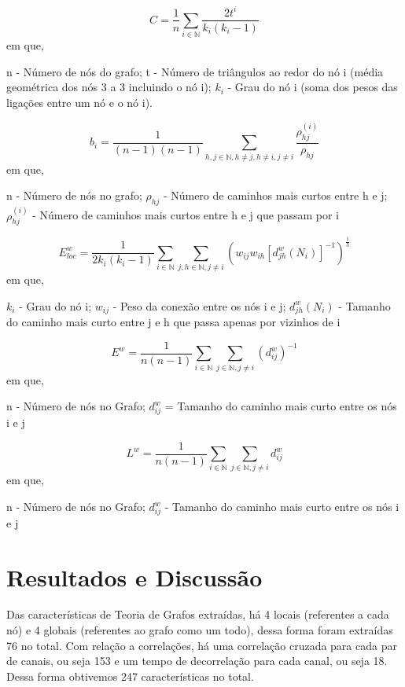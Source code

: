 \documentclass[a4paper,11pt]{article} %
\begin{document}
\begin{equation} \label{eq:coeficiente}
	C = \frac{1}{n} \sum_{i \in \mathbb{N}} \dfrac{2t^i}{k_i(k_i-1)}
\end{equation}
em que,

n - Número de nós do grafo; t - Número de triângulos ao redor do nó i (média geométrica dos nós 3 a 3 incluindo o nó i); $k_i$ - Grau do nó i (soma dos pesos das ligações entre um nó e o nó i).

\begin{equation} \label{eq:betwennes}
	b_i = \frac{1}{(n - 1)(n - 1)} \sum_{h,j \in \mathbb{N}, h\neq j, h \neq i, j \neq i} \frac{\rho_{hj}^{(i)}}{\rho_{hj}}
\end{equation}
em que,

n - Número de nós no grafo; $\rho_{hj}$ - Número de caminhos mais curtos entre h e j; $\rho_{hj}^{(i)}$ - Número de caminhos mais curtos entre h e j que passam por i

\begin{equation} \label{eq:local}
	E^w_{loc} = \frac{1}{2 k_i (k_i -1)} \sum_{i \in \mathbb{N}} \sum_{j, h \in \mathbb{N}, j\neq i} (w_{ij}w_{ih}[d_{jh}^w(N_i)]^{-1})^{\frac{1}{3}}
\end{equation}
em que,

$k_i$ - Grau do nó i; $w_{ij}$ - Peso da conexão entre os nós i e j; $d_{jh}^w(N_i)$ - Tamanho do caminho mais curto entre j e h que passa apenas por vizinhos de i

\begin{equation} \label{eq:global}
	E^w = \frac{1}{n(n-1)}\sum_{i \in \mathbb{N}} \sum_{j \in \mathbb{N}, j \neq i} (d_{ij}^w)^{-1}
\end{equation}
em que,

n - Número de nós no Grafo; $d_{ij}^w$ = Tamanho do caminho mais curto entre os nós i e j

\begin{equation} \label{eq:caracteristico}
	L^w = \frac{1}{n (n - 1)} \sum_ {i \in \mathbb{N}} \sum_{j \in \mathbb{N}, j \neq i} d_{ij}^w
\end{equation}
em que,

n - Número de nós no Grafo; $d_{ij}^w$ - Tamanho do caminho mais curto entre os nós i e j


\section*{Resultados e Discussão}

Das características de Teoria de Grafos extraídas, há 4 locais (referentes a cada nó) e 4 globais (referentes ao grafo como um todo), dessa forma foram extraídas 76 no total. Com relação a correlações, há uma correlação cruzada para cada par de canais, ou seja 153 e um tempo de decorrelação para cada canal, ou seja 18. Dessa forma obtivemos 247 características no total.
\end{document}
